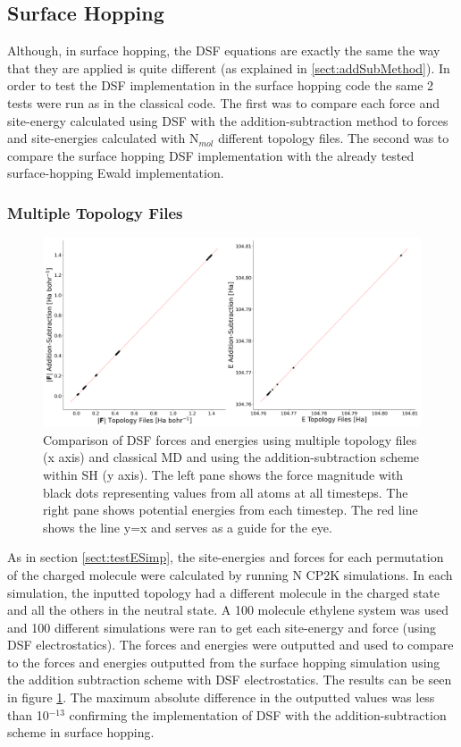 \subsection{Surface Hopping}
Although, in surface hopping, the DSF equations are exactly the same the way that they are applied is quite different (as explained in \ref{sect:addSubMethod}). In order to test the DSF implementation in the surface hopping code the same 2 tests were run as in the classical code. The first was to compare each force and site-energy calculated using DSF with the addition-subtraction method to forces and site-energies calculated with N$_{mol}$ different topology files. The second was to compare the surface hopping DSF implementation with the already tested surface-hopping Ewald implementation.

\subsubsection{Multiple Topology Files}
\begin{figure}[ht]
  \includegraphics[width=\textwidth]{./img/ES/DSF_SH_test_topologies.png}
	\caption{\label{fig:FSSH_DSF_top}Comparison of DSF forces and energies using multiple topology files (x axis) and classical MD and using the addition-subtraction scheme within SH (y axis). The left pane shows the force magnitude with black dots representing values from all atoms at all timesteps. The right pane shows potential energies from each timestep. The red line shows the line y=x and serves as a guide for the eye.}
\end{figure}
\noindent As in section \ref{sect:testESimp}, the site-energies and forces for each permutation of the charged molecule were calculated by running N CP2K simulations. In each simulation, the inputted topology had a different molecule in the charged state and all the others in the neutral state. A 100 molecule ethylene system was used and 100 different simulations were ran to get each site-energy and force (using DSF electrostatics). The forces and energies were outputted and used to compare to the forces and energies outputted from the surface hopping simulation using the addition subtraction scheme with DSF electrostatics. The results can be seen in figure \ref{fig:FSSH_DSF_top}. The maximum absolute difference in the outputted values was less than 10$^{-13}$ confirming the implementation of DSF with the addition-subtraction scheme in surface hopping.
